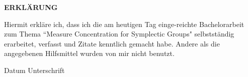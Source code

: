 

{
\thispagestyle{empty}

\LARGE \textbf{ERKLÄRUNG}

\bigskip \medskip

\Large

Hiermit erkläre ich, dass ich die am heutigen Tag einge-reichte
Bachelorarbeit zum Thema
``Measure Concentration for Symplectic Groups"
selbstständig
erarbeitet, verfasst und Zitate kenntlich gemacht habe. Andere als
die angegebenen Hilfsmittel wurden von mir nicht benutzt.

\bigskip \bigskip \bigskip \bigskip \bigskip




Datum \hfill Unterschrift

\normalsize

\bigskip \bigskip \bigskip

}